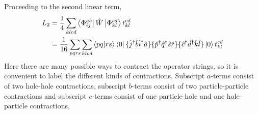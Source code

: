 Proceeding to the second linear term,
\begin{equation}
    \begin{aligned}
    L_2 &= \frac{1}{4}\sum_{klcd} \bra{\Phi^{ab}_{ij}} \hat{W} \ket{\Phi^{cd}_{kl}} t^{cd}_{kl} \\
        &= \frac{1}{16}\sum_{pqrs} \sum_{klcd} \bra{pq} \ket{rs} \bra{0}
            \{\hat{j}^\dagger \hat{b} \hat{i}^\dagger  \hat{a} \}
            \{\hat{p}^\dagger \hat{q}^\dagger \hat{s} \hat{r} \}
            \{\hat{c}^\dagger \hat{d}^\dagger \hat{k} \hat{l} \}
        \ket{0}t^{cd}_{kl}
    \end{aligned}
\end{equation}
Here there are many possible ways to contract the operator strings, so it is convenient
to label the different kinds of contractions. Subscript $a$-terms consist of two
hole-hole contractions, subscript $b$-terms consist of two particle-particle
contractions and subscript $c$-terms consist of one particle-hole and one
hole-particle contractions,
